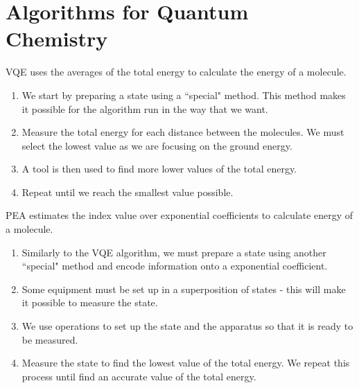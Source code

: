 \documentclass[14pt,landscape,color=UCLdarkred,margin=3cm]{uclposter}
\begin{document}
\begin{multicols}{3}
\begin{figure}[H]
   
\end{figure}

\section*{Algorithms for Quantum Chemistry}

VQE uses the averages of the total energy to calculate the energy of a molecule.

\begin{highlightbox}
  \begin{enumerate}
\item We start by preparing a state using a ``special" method. This method makes it possible for the algorithm run in the way that we want.
\item Measure the total energy for each distance between the molecules. We must select the lowest value as we are focusing on the ground energy.
\item A tool is then used to find more lower values of the total energy.
\item Repeat until we reach the smallest value possible.
\end{enumerate}
\end{highlightbox}

PEA estimates the index value over exponential coefficients to calculate energy of a molecule.


\begin{highlightbox}
\begin{enumerate}
\item Similarly to the VQE algorithm, we must prepare a state using another ``special" method and encode information onto a exponential coefficient. 
\item Some equipment must be set up in a superposition of states - this will make it possible to measure the state.
\item We use operations to set up the state and the apparatus so that it is ready to be measured. 
\item Measure the state to find the lowest value of the total energy. We repeat this process until find an accurate value of the total energy.
\end{enumerate}
\end{highlightbox}




\end{multicols}
\end{document}
